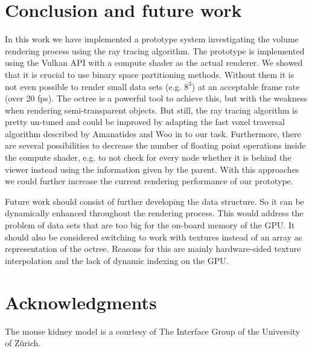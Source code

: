 \documentclass[12pt,conference]{IEEEtran}
\begin{document}
\section{Conclusion and future work}
\label{conclusion}
In this work we have implemented a prototype system investigating the volume rendering process using the ray tracing algorithm. The prototype is implemented using the Vulkan API with a compute shader as the actual renderer. We showed that it is crucial to use binary space partitioning methods. Without them it is not even possible to render small data sets (e.g. $8^3$) at an acceptable frame rate (over 20 fps). The octree is a powerful tool to achieve this, but with the weakness when rendering semi-transparent objects. But still, the ray tracing algorithm is pretty un-tuned and could be improved by adapting the fast voxel traversal algorithm described by Amanatides and Woo in \cite{amanatides1987fast} to our task. Furthermore, there are several possibilities to decrease the number of floating point operations inside the compute shader, e.g. to not check for every node whether it is behind the viewer instead using the information given by the parent. With this approaches we could further increase the current rendering performance of our prototype.
\par
Future work should consist of further developing the data structure. So it can be dynamically enhanced throughout the rendering process. This would address the problem of data sets that are too big for the on-board memory of the GPU. It should also be considered switching to work with textures instead of an array as representation of the octree. Reasons for this are mainly hardware-sided texture interpolation and the lack of dynamic indexing on the GPU.

\section{Acknowledgments}
The mouse kidney model is a courtesy of The Interface Group of the University of Zürich.



\end{document}
